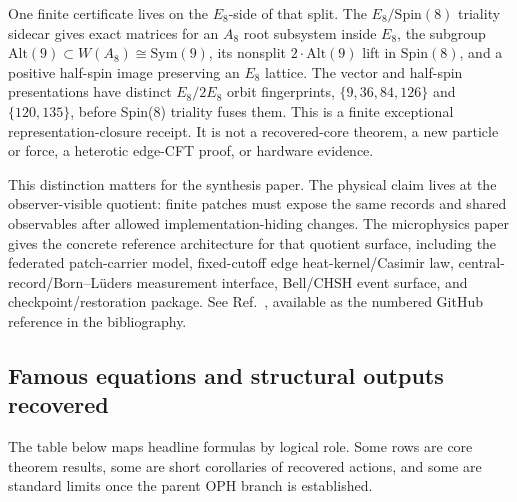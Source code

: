 \documentclass[11pt]{article}
\begin{document}
One finite certificate lives on the \(E_8\)-side of that split. The
\(E_8/\mathrm{Spin}(8)\) triality sidecar gives exact matrices for an \(A_8\) root subsystem inside
\(E_8\), the subgroup \(\mathrm{Alt}(9)\subset W(A_8)\cong\mathrm{Sym}(9)\), its nonsplit
\(2\!\cdot\!\mathrm{Alt}(9)\) lift in \(\mathrm{Spin}(8)\), and a positive half-spin image
preserving an \(E_8\) lattice. The vector and half-spin presentations have distinct
\(E_8/2E_8\) orbit fingerprints, \(\{9,36,84,126\}\) and \(\{120,135\}\), before Spin(8)
triality fuses them. This is a finite exceptional representation-closure receipt. It is not a
recovered-core theorem, a new particle or force, a heterotic edge-CFT proof, or hardware evidence.

This distinction matters for the synthesis paper. The physical claim lives at the observer-visible
quotient: finite patches must expose the same records and shared observables after allowed
implementation-hiding changes. The microphysics paper gives the concrete reference architecture for
that quotient surface, including the federated patch-carrier model, fixed-cutoff edge
heat-kernel/Casimir law, central-record/Born--L\"uders measurement interface, Bell/CHSH event
surface, and checkpoint/restoration package. See Ref.~\cite{ophmicrophysics}, available as the
numbered GitHub reference in the bibliography.

\subsection*{Famous equations and structural outputs recovered}

The table below maps headline formulas by logical role. Some rows are core theorem results, some
are short corollaries of recovered actions, and some are standard limits once the parent OPH
branch is established.
\end{document}
